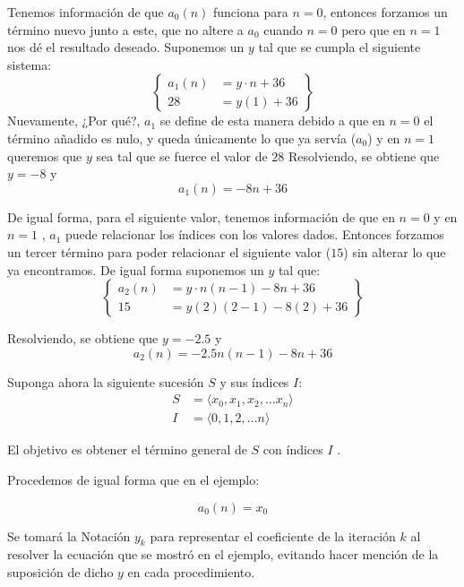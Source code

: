 \documentclass{article}
\begin{document}
Tenemos información de que $a_0(n)$ funciona para $n = 0$, entonces forzamos un término nuevo junto a este, que no altere a $a_0$ cuando $n=0$ pero que en $n=1$ nos dé el resultado deseado.
Suponemos un $y$ tal que se cumpla el siguiente sistema:
\begin{equation*}
    \left\{
        \begin{aligned}
            a_1(n) &= y\cdot n + 36\\
            28 &= y(1) + 36
        \end{aligned}
    \right\}
\end{equation*}
Nuevamente, ¿Por qué?, $a_1$ se define de esta manera debido a que en $n=0$ el término añadido es nulo, y queda únicamente lo que ya servía ($a_0$) y en $n=1$ queremos que $y$ sea tal que se fuerce el valor de $28$
Resolviendo, se obtiene que $y = -8$ y
\[a_1(n) = -8n + 36\]

De igual forma, para el siguiente valor, tenemos información de que en $n=0$ y en $n=1$ , $a_1$ puede relacionar los índices con los valores dados. Entonces forzamos un tercer término para poder relacionar el siguiente valor ($15$) sin alterar lo que ya encontramos. De igual forma suponemos un $y$ tal que:
\begin{equation*}
    \left\{
        \begin{aligned}
            a_2(n) &= y\cdot n(n-1) -8n + 36\\
            15 &= y (2)(2-1) - 8(2) + 36
        \end{aligned}
    \right\}
\end{equation*}

Resolviendo, se obtiene que $y = -2.5$ y
\[a_2(n) = -2.5n(n-1) - 8n + 36\]


Suponga ahora la siguiente sucesión $S$ y sus índices $I$:
\begin{align*}
    S &= \langle x_0, x_1, x_2, \dots x_n\rangle\\
    I &= \langle 0, 1, 2, \dots n \rangle
\end{align*}

El objetivo es obtener el término general de $S$ con índices $I$ .

Procedemos de igual forma que en el ejemplo:

\[a_0(n) = x_0\]

Se tomará la Notación $y_k$ para representar el coeficiente de la iteración $k$ al resolver la ecuación que se mostró en el ejemplo, evitando hacer mención de la suposición de dicho $y$ en cada procedimiento.
\end{document}
